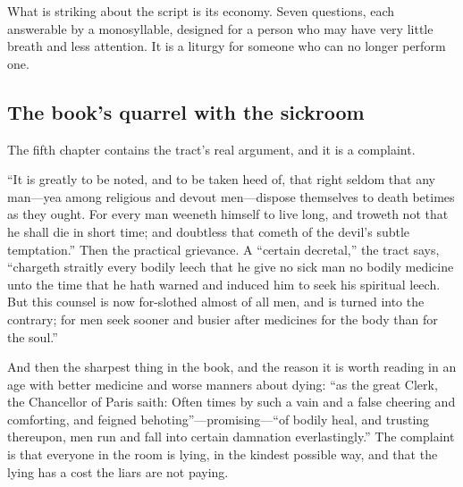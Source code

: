 What is striking about the script is its economy. Seven questions, each answerable by a monosyllable, designed for a person who may have very little breath and less attention. It is a liturgy for someone who can no longer perform one.

\subsection{The book's quarrel with the sickroom}

The fifth chapter contains the tract's real argument, and it is a complaint.

``It is greatly to be noted, and to be taken heed of, that right seldom that any man---yea among religious and devout men---dispose themselves to death betimes as they ought. For every man weeneth himself to live long, and troweth not that he shall die in short time; and doubtless that cometh of the devil's subtle temptation.'' Then the practical grievance. A ``certain decretal,'' the tract says, ``chargeth straitly every bodily leech that he give no sick man no bodily medicine unto the time that he hath warned and induced him to seek his spiritual leech. But this counsel is now for-slothed almost of all men, and is turned into the contrary; for men seek sooner and busier after medicines for the body than for the soul.''

And then the sharpest thing in the book, and the reason it is worth reading in an age with better medicine and worse manners about dying: ``as the great Clerk, the Chancellor of Paris saith: Often times by such a vain and a false cheering and comforting, and feigned behoting''---promising---``of bodily heal, and trusting thereupon, men run and fall into certain damnation everlastingly.'' The complaint is that everyone in the room is lying, in the kindest possible way, and that the lying has a cost the liars are not paying.

